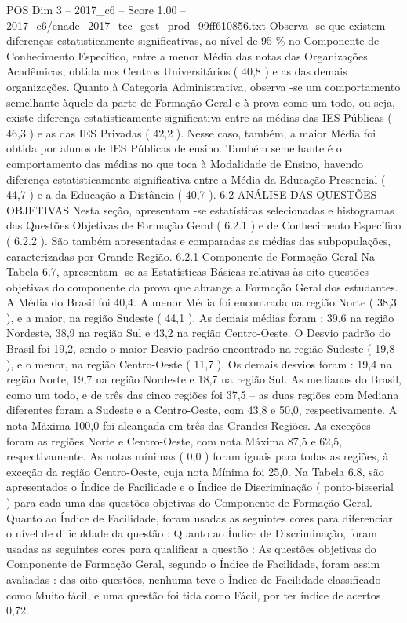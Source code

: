 \begin{textsample}{POS Dim 3 – 2017\_c6 – Score 1.00 – 2017\_c6/enade\_2017\_tec\_gest\_prod\_99ff610856.txt}
Observa -se que existem diferenças estatisticamente significativas, ao nível de 95 \% no Componente de Conhecimento Específico, entre a menor Média das notas das Organizações Acadêmicas, obtida nos Centros Universitários ( 40,8 ) e as das demais organizações.
Quanto à Categoria Administrativa, observa -se um comportamento semelhante àquele da parte de Formação Geral e à prova como um todo, ou seja, existe diferença estatisticamente significativa entre as médias das IES Públicas ( 46,3 ) e as das IES Privadas ( 42,2 ).
Nesse caso, também, a maior Média foi obtida por alunos de IES Públicas de ensino.
Também semelhante é o comportamento das médias no que toca à Modalidade de Ensino, havendo diferença estatisticamente significativa entre a Média da Educação Presencial ( 44,7 ) e a da Educação a Distância ( 40,7 ). 6.2 ANÁLISE DAS QUESTÕES OBJETIVAS Nesta seção, apresentam -se estatísticas selecionadas e histogramas das Questões Objetivas de Formação Geral ( 6.2.1 ) e de Conhecimento Específico ( 6.2.2 ).
São também apresentadas e comparadas as médias das subpopulações, caracterizadas por Grande Região. 6.2.1 Componente de Formação Geral Na Tabela 6.7, apresentam -se as Estatísticas Básicas relativas às oito questões objetivas do componente da prova que abrange a Formação Geral dos estudantes.
A Média do Brasil foi 40,4.
A menor Média foi encontrada na região Norte ( 38,3 ), e a maior, na região Sudeste ( 44,1 ).
As demais médias foram : 39,6 na região Nordeste, 38,9 na região Sul e 43,2 na região Centro-Oeste.
O Desvio padrão do Brasil foi 19,2, sendo o maior Desvio padrão encontrado na região Sudeste ( 19,8 ), e o menor, na região Centro-Oeste ( 11,7 ).
Os demais desvios foram : 19,4 na região Norte, 19,7 na região Nordeste e 18,7 na região Sul.
As medianas do Brasil, como um todo, e de três das cinco regiões foi 37,5 – as duas regiões com Mediana diferentes foram a Sudeste e a Centro-Oeste, com 43,8 e 50,0, respectivamente.
A nota Máxima 100,0 foi alcançada em três das Grandes Regiões.
As exceções foram as regiões Norte e Centro-Oeste, com nota Máxima 87,5 e 62,5, respectivamente.
As notas mínimas ( 0,0 ) foram iguais para todas as regiões, à exceção da região Centro-Oeste, cuja nota Mínima foi 25,0.
Na Tabela 6.8, são apresentados o Índice de Facilidade e o Índice de Discriminação ( ponto-bisserial ) para cada uma das questões objetivas do Componente de Formação Geral.
Quanto ao Índice de Facilidade, foram usadas as seguintes cores para diferenciar o nível de dificuldade da questão : Quanto ao Índice de Discriminação, foram usadas as seguintes cores para qualificar a questão : As questões objetivas do Componente de Formação Geral, segundo o Índice de Facilidade, foram assim avaliadas : das oito questões, nenhuma teve o Índice de Facilidade classificado como Muito fácil, e uma questão foi tida como Fácil, por ter índice de acertos 0,72.

\end{textsample}
